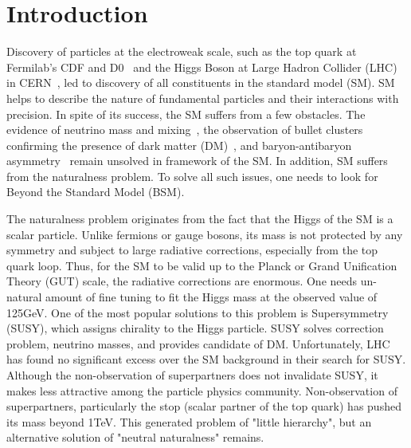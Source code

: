\section{Introduction}\label{sec:introduction}

Discovery of particles at the electroweak scale, such as the top quark at Fermilab's CDF and D0~\cite{topD0,topCDF} and the Higgs Boson at Large Hadron Collider (LHC) in CERN~\cite{higgscms,higgsatlas}, led to discovery of all constituents in the standard model (SM). 
SM helps to describe the nature of fundamental particles and their interactions with precision. 
In spite of its success, the SM suffers from a few obstacles. 
The evidence of neutrino mass and mixing~\cite{neutrino}, the observation of bullet clusters confirming the presence of dark matter (DM)~\cite{Baumgart:2009tn,Kaplan:2009ag,Chan:2011aa,Dienes:2011ja,Dienes:2012yz}, and baryon-antibaryon asymmetry~\cite{Cui:2014twa} remain unsolved in framework of the SM. 
In addition, SM suffers from the naturalness problem. 
To solve all such issues, one needs to look for Beyond the Standard Model (BSM).

The naturalness problem originates from the fact that the Higgs of the SM is a scalar particle. 
Unlike fermions or gauge bosons, its mass is not protected by any symmetry and subject to large radiative corrections, especially from the top quark loop. 
Thus, for the SM to be valid up to the Planck or Grand Unification Theory (GUT) scale, the radiative corrections are enormous. 
One needs un-natural amount of fine tuning to fit the Higgs mass at the observed value of 125GeV.
One of the most popular solutions to this problem is Supersymmetry (SUSY), which assigns chirality to the Higgs particle. 
SUSY solves correction problem, neutrino masses, and provides candidate of DM. 
Unfortunately, LHC has found no significant excess over the SM background in their search for SUSY\cite{SUSY}. 
Although the non-observation of superpartners does not invalidate SUSY, it makes less attractive among the particle physics community. 
Non-observation of superpartners, particularly the stop (scalar partner of the top quark) has pushed its mass beyond 1TeV. 
This generated problem of "little hierarchy", but an alternative solution of "neutral naturalness" remains. 

